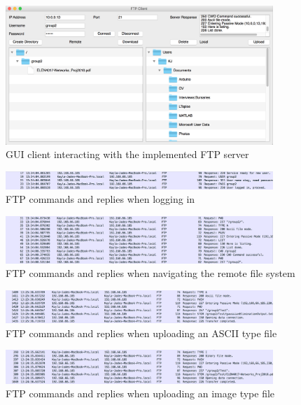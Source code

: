 \documentclass[10pt,twocolumn]{witseiepaper}
\begin{document}
\begin{appendix}
\begin{figure}[h]
	\centering
	\includegraphics[width=0.9\textwidth]{gui.png}
	\caption{GUI client interacting with the implemented FTP server}
	\raggedright
	\label{fig:gui}	
\end{figure}

\begin{figure}[h]
	\centering
	\includegraphics[width=0.9\textwidth]{ourServerLogin.png}
	\caption{FTP commands and replies when logging in}
	\raggedright
	\label{fig:login}	
\end{figure}

\begin{figure}[h]
	\centering
	\includegraphics[width=0.9\textwidth]{ourServerNavigate.png}
	\caption{FTP commands and replies when navigating the remote file system}
	\raggedright
	\label{fig:navigate}	
\end{figure}

\begin{figure}[h]
	\centering
	\includegraphics[width=0.9\textwidth]{ourServerUploadText.png}
	\caption{FTP commands and replies when uploading an ASCII type file}
	\raggedright
	\label{fig:textupload}	
\end{figure}

\begin{figure}[h]
	\centering
	\includegraphics[width=0.9\textwidth]{ourServerUploadPDF.png}
	\caption{FTP commands and replies when uploading an image type file}
	\raggedright
	\label{fig:pdfupload}	
\end{figure}


\end{appendix}
\end{document}
